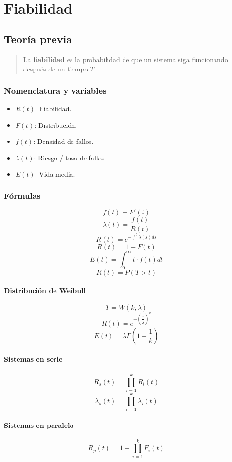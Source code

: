 \chapter{Fiabilidad}
\noindent
\section{Teoría previa}
\begin{quote}
    La \textbf{fiabilidad} es la probabilidad de que un sistema siga funcionando después de un tiempo $T$.
\end{quote}

\subsection{Nomenclatura y variables}
\begin{itemize}
    \item $R(t)$: Fiabilidad.
    \item $F(t)$: Distribución.
    \item $f(t)$: Densidad de fallos.
    \item $\lambda(t)$: Riesgo / tasa de fallos.
    \item $E(t)$: Vida media.
\end{itemize}
\subsection{Fórmulas}
\begin{multicols}{3}
\[f(t) = F'(t)\]
\[\lambda(t) = \dfrac{f(t)}{R(t)}\]
\[R(t) = e^{-\int_0^t \lambda(s) ds}\]
\[R(t) = 1 - F(t)\]
\[E(t)= \int_0^{\infty}t\cdot f(t)dt\]
\[R(t)= P(T>t)\]
\end{multicols}
\subsubsection{Distribución de Weibull}
\begin{multicols}{3}
\[T= W(k, \lambda)\]
\[R(t)= e^{-(\dfrac{t}{\lambda})^k}\]
\[E(t) = \lambda \Gamma (1+\dfrac{1}{k})\]
\end{multicols}
\subsubsection{Sistemas en serie}
\begin{multicols}{2}
\[R_s(t)= \prod_{i=1}^{k}R_i(t)\]
\[\lambda_s(t)= \prod_{i=1}^{k}\lambda_i(t)\]
\end{multicols}
\subsubsection{Sistemas en paralelo}
\[R_p(t)= 1-\prod_{i=1}^{k}F_i(t)\]
